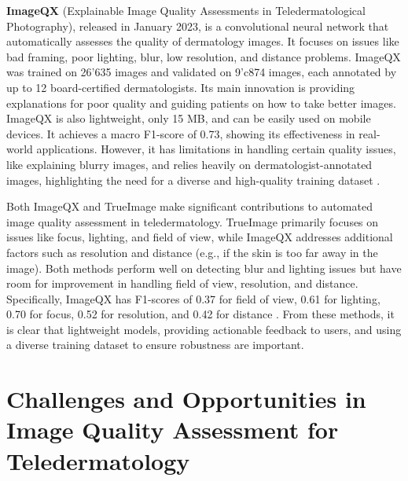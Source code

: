 \textbf{ImageQX} (Explainable Image Quality Assessments in Teledermatological Photography), released in January 2023, is a convolutional neural network that automatically assesses the quality of dermatology images. It focuses on issues like bad framing, poor lighting, blur, low resolution, and distance problems. ImageQX was trained on 26'635 images and validated on 9'c874 images, each annotated by up to 12 board-certified dermatologists. Its main innovation is providing explanations for poor quality and guiding patients on how to take better images. ImageQX is also lightweight, only 15 MB, and can be easily used on mobile devices. It achieves a macro F1-score of 0.73, showing its effectiveness in real-world applications. However, it has limitations in handling certain quality issues, like explaining blurry images, and relies heavily on dermatologist-annotated images, highlighting the need for a diverse and high-quality training dataset \autocite{ImageQX}.
\par
\vspace{\baselineskip}
\noindent
Both ImageQX and TrueImage make significant contributions to automated image quality assessment in teledermatology. TrueImage primarily focuses on issues like focus, lighting, and field of view, while ImageQX addresses additional factors such as resolution and distance (e.g., if the skin is too far away in the image). Both methods perform well on detecting blur and lighting issues but have room for improvement in handling field of view, resolution, and distance. Specifically, ImageQX has F1-scores of 0.37 for field of view, 0.61 for lighting, 0.70 for focus, 0.52 for resolution, and 0.42 for distance \autocite{ImageQX}. From these methods, it is clear that lightweight models, providing actionable feedback to users, and using a diverse training dataset to ensure robustness are important. \par
\clearpage
\section{Challenges and Opportunities in Image Quality Assessment for Teledermatology}
\label{sec:ChallengesOpportunitiesTeledermatology}
\vspace{\baselineskip}

